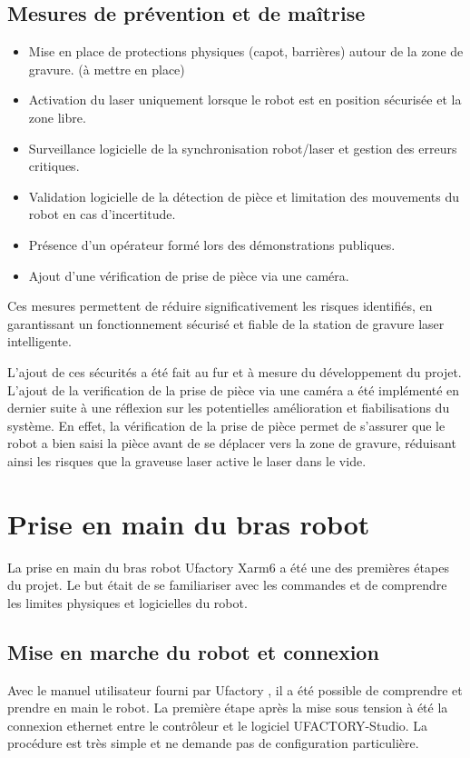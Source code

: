 \subsection{Mesures de prévention et de maîtrise}
\begin{itemize}
    \item Mise en place de protections physiques (capot, barrières) autour de la zone de gravure. (à mettre en place)
    \item Activation du laser uniquement lorsque le robot est en position sécurisée et la zone libre.
    \item Surveillance logicielle de la synchronisation robot/laser et gestion des erreurs critiques.
    \item Validation logicielle de la détection de pièce et limitation des mouvements du robot en cas d'incertitude.
    \item Présence d'un opérateur formé lors des démonstrations publiques.
    \item Ajout d'une vérification de prise de pièce via une caméra.
\end{itemize}

Ces mesures permettent de réduire significativement les risques identifiés, en garantissant un fonctionnement sécurisé et fiable de la station de gravure laser intelligente.

L'ajout de ces sécurités a été fait au fur et à mesure du développement du projet. L'ajout de la verification de la prise de pièce via une caméra a été implémenté en dernier suite à une réflexion sur les potentielles amélioration et fiabilisations du système. En effet, la vérification de la prise de pièce permet de s'assurer que le robot a bien saisi la pièce avant de se déplacer vers la zone de gravure, réduisant ainsi les risques que la graveuse laser active le laser dans le vide.


\section{Prise en main du bras robot}
La prise en main du bras robot Ufactory Xarm6 a été une des premières étapes du projet. Le but était de se familiariser avec les commandes et de comprendre les limites physiques et logicielles du robot.

\subsection{Mise en marche du robot et connexion}
Avec le manuel utilisateur fourni par Ufactory \cite{UserManual}, il a été possible de comprendre et prendre en main le robot. La première étape après la mise sous tension à été la connexion ethernet entre le contrôleur et le logiciel UFACTORY-Studio. La procédure est très simple et ne demande pas de configuration particulière.

